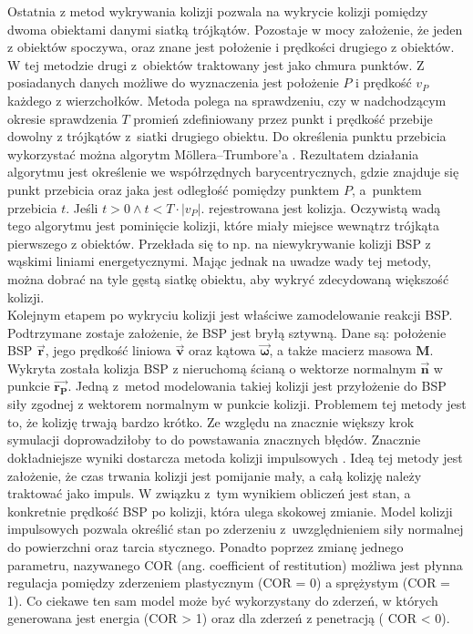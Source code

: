 Ostatnia z metod wykrywania kolizji pozwala na wykrycie kolizji pomiędzy dwoma obiektami danymi siatką trójkątów. Pozostaje w mocy założenie, że jeden z obiektów spoczywa, oraz znane jest położenie i prędkości drugiego z obiektów. W tej metodzie drugi z~obiektów traktowany jest jako chmura punktów. Z posiadanych danych możliwe do wyznaczenia jest położenie $P$ i prędkość $v_P$ każdego z wierzchołków. Metoda polega na sprawdzeniu, czy w nadchodzącym okresie sprawdzenia $T$ promień zdefiniowany przez punkt i prędkość przebije dowolny z trójkątów z~siatki drugiego obiektu. Do określenia punktu przebicia wykorzystać można algorytm Möllera–Trumbore'a \cite{ray_intersaction}. Rezultatem działania algorytmu jest określenie we współrzędnych barycentrycznych, gdzie znajduje się punkt przebicia oraz jaka jest odległość pomiędzy punktem $P$, a~punktem przebicia $t$. Jeśli $t > 0 \land t < T\cdot |v_P|$. rejestrowana jest kolizja. Oczywistą wadą tego algorytmu jest pominięcie kolizji, które miały miejsce wewnątrz trójkąta pierwszego z obiektów. Przekłada się to np. na niewykrywanie kolizji BSP z wąskimi liniami energetycznymi. Mając jednak na uwadze wady tej metody, można dobrać na tyle gęstą siatkę obiektu, aby wykryć zdecydowaną większość kolizji.\\


Kolejnym etapem po wykryciu kolizji jest właściwe zamodelowanie reakcji BSP. Podtrzymane zostaje założenie, że BSP jest bryłą sztywną.  Dane są: położenie BSP $\bm{\vec{r}}$, jego prędkość liniowa $\bm{\vec{v}}$ oraz kątowa $\bm{\vec{\omega}}$, a także macierz masowa $\bm{M}$. Wykryta została kolizja BSP z nieruchomą ścianą o wektorze normalnym $\bm{\vec{n}}$ w punkcie $\bm{\vec{r_P}}$. Jedną z~metod modelowania takiej kolizji jest przyłożenie do BSP siły zgodnej z wektorem normalnym w punkcie kolizji. Problemem tej metody jest to, że kolizję trwają bardzo krótko. Ze względu na znacznie większy krok symulacji doprowadziłoby to do powstawania znacznych błędów. Znacznie dokładniejsze wyniki dostarcza metoda kolizji impulsowych \cite{impulse_collision}. Ideą tej metody jest założenie, że czas trwania kolizji jest pomijanie mały, a całą kolizję należy traktować jako impuls. W związku z~tym wynikiem obliczeń jest stan, a konkretnie prędkość BSP po kolizji, która ulega skokowej zmianie. Model kolizji impulsowych pozwala określić stan po zderzeniu z~uwzględnieniem siły normalnej do powierzchni oraz tarcia stycznego. Ponadto poprzez zmianę jednego parametru, nazywanego COR (ang. coefficient of restitution) możliwa jest płynna regulacja pomiędzy zderzeniem plastycznym (COR = 0) a sprężystym (COR = 1). Co ciekawe ten sam model może być wykorzystany do zderzeń, w których generowana jest energia (COR > 1) oraz dla zderzeń z penetracją ( COR < 0).\\

